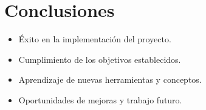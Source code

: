 \documentclass{article}
\begin{document}
\section{Conclusiones}
\begin{itemize}
    \item Éxito en la implementación del proyecto.
    \item Cumplimiento de los objetivos establecidos.
    \item Aprendizaje de nuevas herramientas y conceptos.
    \item Oportunidades de mejoras y trabajo futuro.
\end{itemize}
\end{document}
